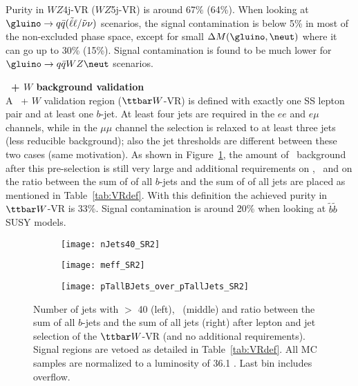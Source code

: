 Purity in $WZ$4j-VR ($WZ$5j-VR) is around 67$\%$ (64\%). When looking at $\gluino \rightarrow q \bar q (\tilde \ell \ell / \tilde \nu \nu)$ scenarios, the signal contamination is below 5\% in most of the non-excluded phase space, except for small $\Delta M(\gluino,\neut)$ where it can go up to 30\% (15\%). Signal contamination is found to be much lower for $\gluino \rightarrow q \bar q WZ \neut$ scenarios.



\par{\bf \ttbar\ + $W$ background validation\\}
A \ttbar\ + $W$ validation region ($\ttbar W$-VR) is defined with exactly one SS lepton pair and at least one $b$-jet. At least four jets are required in the $ee$ and $e\mu$ channels, while in the $\mu\mu$ channel the selection is relaxed to at least three jets  (less reducible background); also the jet \pt thresholds are different between these two cases (same motivation). As shown in Figure~\ref{fig:ttW_VR_afterLepJetSel}, the amount of \ttbar\ background after this pre-selection is still very large and additional requirements on \met, \meff\ and on the ratio between the sum of \pt of all $b$-jets and the sum of \pt of all jets are placed as mentioned in Table~\ref{tab:VRdef}. With this definition the achieved purity in $\ttbar W$-VR is 33\%. 
Signal contamination is around 20\% when looking at $\tilde b\tilde b$ SUSY 
models.

\begin{figure}[t!]
\centering
\begin{subfigure}[t]{0.32\textwidth}
\texttt{[image: nJets40\_SR2]}
\end{subfigure}
\begin{subfigure}[t]{0.32\textwidth}
\texttt{[image: meff\_SR2]}
\end{subfigure}
\begin{subfigure}[t]{0.32\textwidth}
\texttt{[image: pTallBJets\_over\_pTallJets\_SR2]}
\end{subfigure}
\caption{Number of jets with \pt $>$ 40 \GeV (left), \meff\ (middle) and ratio between the sum of all $b$-jets \pt and the sum of all jets \pt (right) after lepton and jet selection of the $\ttbar W$-VR (and no additional requirements). Signal regions are vetoed as detailed in Table~\ref{tab:VRdef}. All MC samples are normalized to a luminosity of 36.1 \ifb. Last bin includes overflow.
}
\label{fig:ttW_VR_afterLepJetSel}
\end{figure} 

